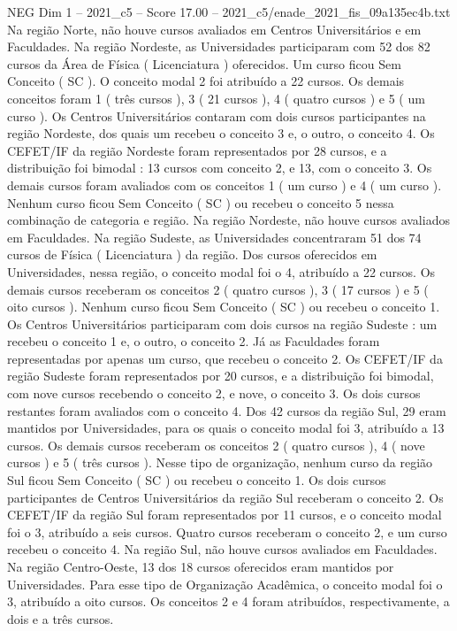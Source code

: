\begin{textsample}{NEG Dim 1 – 2021\_c5 – Score 17.00 – 2021\_c5/enade\_2021\_fis\_09a135ec4b.txt}
Na região Norte, não houve cursos avaliados em Centros Universitários e em Faculdades.
Na região Nordeste, as Universidades participaram com 52 dos 82 cursos da Área de Física ( Licenciatura ) oferecidos.
Um curso ficou Sem Conceito ( SC ).
O conceito modal 2 foi atribuído a 22 cursos.
Os demais conceitos foram 1 ( três cursos ), 3 ( 21 cursos ), 4 ( quatro cursos ) e 5 ( um curso ).
Os Centros Universitários contaram com dois cursos participantes na região Nordeste, dos quais um recebeu o conceito 3 e, o outro, o conceito 4.
Os CEFET/IF da região Nordeste foram representados por 28 cursos, e a distribuição foi bimodal : 13 cursos com conceito 2, e 13, com o conceito 3.
Os demais cursos foram avaliados com os conceitos 1 ( um curso ) e 4 ( um curso ).
Nenhum curso ficou Sem Conceito ( SC ) ou recebeu o conceito 5 nessa combinação de categoria e região.
Na região Nordeste, não houve cursos avaliados em Faculdades.
Na região Sudeste, as Universidades concentraram 51 dos 74 cursos de Física ( Licenciatura ) da região.
Dos cursos oferecidos em Universidades, nessa região, o conceito modal foi o 4, atribuído a 22 cursos.
Os demais cursos receberam os conceitos 2 ( quatro cursos ), 3 ( 17 cursos ) e 5 ( oito cursos ).
Nenhum curso ficou Sem Conceito ( SC ) ou recebeu o conceito 1.
Os Centros Universitários participaram com dois cursos na região Sudeste : um recebeu o conceito 1 e, o outro, o conceito 2.
Já as Faculdades foram representadas por apenas um curso, que recebeu o conceito 2.
Os CEFET/IF da região Sudeste foram representados por 20 cursos, e a distribuição foi bimodal, com nove cursos recebendo o conceito 2, e nove, o conceito 3.
Os dois cursos restantes foram avaliados com o conceito 4.
Dos 42 cursos da região Sul, 29 eram mantidos por Universidades, para os quais o conceito modal foi 3, atribuído a 13 cursos.
Os demais cursos receberam os conceitos 2 ( quatro cursos ), 4 ( nove cursos ) e 5 ( três cursos ).
Nesse tipo de organização, nenhum curso da região Sul ficou Sem Conceito ( SC ) ou recebeu o conceito 1.
Os dois cursos participantes de Centros Universitários da região Sul receberam o conceito 2.
Os CEFET/IF da região Sul foram representados por 11 cursos, e o conceito modal foi o 3, atribuído a seis cursos.
Quatro cursos receberam o conceito 2, e um curso recebeu o conceito 4.
Na região Sul, não houve cursos avaliados em Faculdades.
Na região Centro-Oeste, 13 dos 18 cursos oferecidos eram mantidos por Universidades.
Para esse tipo de Organização Acadêmica, o conceito modal foi o 3, atribuído a oito cursos.
Os conceitos 2 e 4 foram atribuídos, respectivamente, a dois e a três cursos.

\end{textsample}
